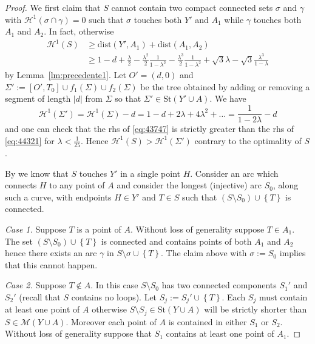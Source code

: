 \documentclass{article}
\renewcommand{\H}{\mathcal H}
\newcommand{\abs}[1]{\left\vert #1 \right\vert}
\newcommand{\ENCLOSE}[1]{\left\{#1\right\}}
\newcommand{\St}{\mathrm{St}}
\newcommand{\M}{\mathcal{M}}
\renewcommand{\H}{\mathcal{H}}
\newcommand{\dist}{\mathrm{dist}}
\theoremstyle{definition}
\theoremstyle{remark}
\begin{document}
\begin{proof}
  We first claim that $S$ cannot contain 
  two compact connected sets 
  $\sigma$ and $\gamma$
  with $\H^1(\sigma\cap \gamma)=0$
  such that $\sigma$ touches both $Y'$ and $A_1$ 
  while $\gamma$ touches both $A_1$ and $A_2$.
  In fact, otherwise
  \begin{equation}
  \label{eq:43747}
  \begin{aligned}
    \H^1(S)
    &\ge \dist(Y', A_1) + \dist(A_1, A_2)
    \\
    &\ge 
    1 - d + \frac{\lambda} 2 
      - \frac{\lambda^2}{2}\frac{1}{1-\lambda^2}
      - \frac{\lambda^3}{2}\frac{1}{1-\lambda^2} 
     +
     \sqrt 3 \lambda - \sqrt 3 \frac{\lambda^3}{1-\lambda}
  \end{aligned}
  \end{equation}
  by Lemma~\ref{lm:precedente1}.
  Let $O'=(d,0)$ and $\Sigma':=[O',T_0] \cup f_1(\Sigma) \cup f_2(\Sigma)$ 
  be the tree obtained by adding or removing a segment of length 
  $\abs{d}$ from $\Sigma$ so that $\Sigma'\in \St(Y'\cup A)$.
  We have  
  \begin{equation}\label{eq:44321}
    \H^1(\Sigma')
    = \H^1(\Sigma) - d 
    = 1 - d + 2 \lambda + 4 \lambda^2 + \dots 
    = \frac{1}{1-2\lambda}-d
  \end{equation}
  and one can check that the rhs of \eqref{eq:43747} is
  strictly greater than the rhs of \eqref{eq:44321}
  for $\lambda < \frac 1 {25}$.
  Hence $\H^1(S) > \H^1(\Sigma')$ contrary 
  to the optimality of $S$.
  
  By \cite{PaoSte} we know that $S$ touches $Y'$ in a single point $H$.
  Consider an arc which connects $H$ to any point of $A$
  and consider the longest (injective) arc $S_0$, along such a curve,
  with endpoints $H\in Y'$ and $T\in S$
  such that $(S\setminus S_0) \cup \ENCLOSE{T}$ is connected.
  
  \emph{Case 1.} 
  Suppose $T$ is a point of $A$.
  Without loss of generality suppose $T\in A_1$.
  The set $(S\setminus S_0)\cup\ENCLOSE{T}$
  is connected and contains points of both $A_1$
  and $A_2$ hence there exists an arc $\gamma$ 
  in $S\setminus \sigma\cup\ENCLOSE{T}$.
  The claim above with $\sigma:=S_0$ implies that this cannot happen.
  
  \emph{Case 2.} Suppose $T\not \in A$.
  In this case $S\setminus S_0$ has two connected components 
  $S_1'$ and $S_2'$ (recall that $S$ contains no loops).
  Let $S_j:=S_j'\cup \ENCLOSE{T}$.
  Each $S_j$ must contain at least one point of $A$ otherwise 
  $S\setminus S_j\in \St(Y\cup A)$ will be 
  strictly shorter than $S\in \M(Y\cup A)$.
  Moreover each point of $A$ is contained in either $S_1$ or $S_2$.
  Without loss of generality suppose that $S_1$ 
  contains at least one point of $A_1$.
  

\end{proof}
\end{document}

